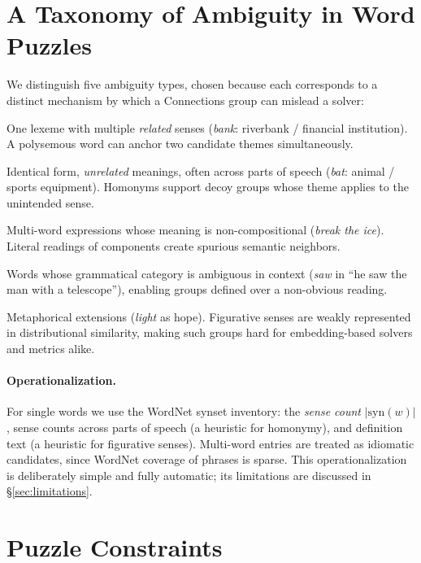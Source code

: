 \documentclass[11pt]{article}
\begin{document}
\section{A Taxonomy of Ambiguity in Word Puzzles}
\label{sec:taxonomy}

We distinguish five ambiguity types, chosen because each corresponds to a distinct mechanism by which a Connections group can mislead a solver:

\begin{description}[leftmargin=0pt, itemsep=2pt]
    \item[Polysemy.] One lexeme with multiple \emph{related} senses (\emph{bank}: riverbank / financial institution). A polysemous word can anchor two candidate themes simultaneously.
    \item[Homonymy.] Identical form, \emph{unrelated} meanings, often across parts of speech (\emph{bat}: animal / sports equipment). Homonyms support decoy groups whose theme applies to the unintended sense.
    \item[Idiomatic.] Multi-word expressions whose meaning is non-compositional (\emph{break the ice}). Literal readings of components create spurious semantic neighbors.
    \item[Syntactic.] Words whose grammatical category is ambiguous in context (\emph{saw} in ``he saw the man with a telescope''), enabling groups defined over a non-obvious reading.
    \item[Figurative.] Metaphorical extensions (\emph{light} as hope). Figurative senses are weakly represented in distributional similarity, making such groups hard for embedding-based solvers and metrics alike.
\end{description}

\paragraph{Operationalization.} For single words we use the WordNet synset inventory: the \emph{sense count} $|\mathrm{syn}(w)|$, sense counts across parts of speech (a heuristic for homonymy), and definition text (a heuristic for figurative senses). Multi-word entries are treated as idiomatic candidates, since WordNet coverage of phrases is sparse. This operationalization is deliberately simple and fully automatic; its limitations are discussed in \S\ref{sec:limitations}.

\section{Puzzle Constraints}
\label{sec:constraints}
\end{document}
